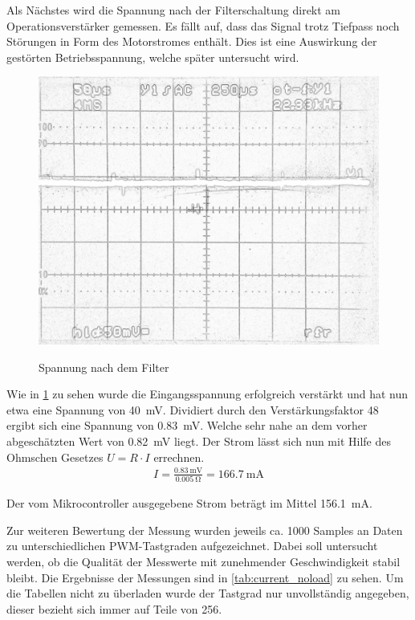 Als Nächstes wird die Spannung nach der Filterschaltung direkt am Operationsverstärker gemessen. Es fällt auf, dass das Signal trotz Tiefpass noch Störungen in Form des Motorstromes enthält.
Dies ist eine Auswirkung der gestörten Betriebsspannung, welche später untersucht wird.


\begin{figure}[H]
\centering
\includegraphics[width=.8\textwidth]{filter_ausgang.png}\\
\caption{Spannung nach dem Filter}%
\label{fig:filter_ausgang}
\end{figure}


Wie in \cref{fig:filter_ausgang} zu sehen wurde die Eingangsspannung erfolgreich ver\-stärkt und hat nun etwa eine Spannung von \SI{40}{\mV}. Dividiert durch den Verstärkungsfaktor 48 ergibt sich eine Spannung von 
\SI{0,83}{\mV}. Welche sehr nahe an dem vorher abgeschätzten Wert von \SI{0,82}{\mV} liegt. Der Strom lässt sich nun mit Hilfe des Ohmschen Gesetzes $U=R\cdot I$ errechnen.
\begin{align*}
I=\frac{\SI{0,83}{\mV}}{\SI{0,005}{\ohm}}=\SI{166,7}{\mA}
\end{align*}

Der vom Mikrocontroller ausgegebene Strom beträgt im Mittel \SI{156,1}{\mA}.

Zur weiteren Bewertung der Messung wurden jeweils ca. 1000 Samples an Daten zu unterschiedlichen PWM-Tastgraden aufgezeichnet.
Dabei soll untersucht werden, ob die Qualität der Messwerte mit zunehmender Geschwindigkeit stabil bleibt.
Die Ergebnisse der Messungen sind in \cref{tab:current_noload} zu sehen.
Um die Tabellen nicht zu überladen wurde der Tastgrad nur unvollständig angegeben, dieser bezieht sich immer auf Teile von 256.

